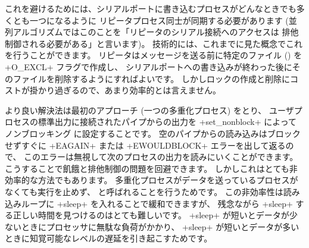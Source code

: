 これを避けるためには、シリアルポートに書き込むプロセスがどんなときでも多くとも一つになるように
リピータプロセス同士が同期する必要があります (並列アルゴリズムではこのことを「リピータのシリアル接続へのアクセスは
排他制御される必要がある」と言います)。
技術的には、これまでに見た概念でこれを行うことができます。
リピータはメッセージを送る前に特定のファイル () を \ml+O_EXCL+ フラグで作成し、
シリアルポートへの書き込みが終わった後にそのファイルを削除するようにすればよいです。
しかしロックの作成と削除にコストが掛かり過ぎるので、あまり効率的とは言えません。

より良い解決法は最初のアプローチ (一つの多重化プロセス) をとり、
ユーザプロセスの標準出力に接続されたパイプからの出力を \ml+set_nonblock+ によってノンブロッキング
に設定することです。
空のパイプからの読み込みはブロックせずすぐに \ml+EAGAIN+ または \ml+EWOULDBLOCK+ エラーを出して返るので、
このエラーは無視して次のプロセスの出力を読みにいくことができます。
こうすることで飢餓と排他制御の問題を回避できます。
しかしこれはとても非効率的な方法でもあります。
多重化プロセスがデータを送っているプロセスがなくても実行を止めず、
 と呼ばれることを行うためです。
この非効率性は読み込みループに \ml+sleep+ を入れることで緩和できますが、
残念ながら \ml+sleep+ する正しい時間を見つけるのはとても難しいです。
\ml+sleep+ が短いとデータが少ないときにプロセッサに無駄な負荷がかかり、
\ml+sleep+ が短いとデータが多いときに知覚可能なレベルの遅延を引き起こすためです。

